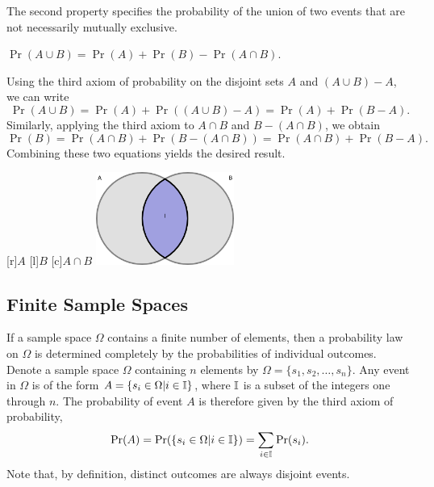 The second property specifies the probability of the union of two events that are not necessarily mutually exclusive.
\begin{proposition}
$\Pr (A \cup B) = \Pr (A) + \Pr (B) - \Pr (A \cap B)$.
\end{proposition}

Using the third axiom of probability on the disjoint sets $A$ and $(A \cup B) - A$, we can write
\begin{equation*}
\Pr (A \cup B)
= \Pr (A) + \Pr ((A \cup B) - A)
= \Pr (A) + \Pr (B - A) .
\end{equation*}
Similarly, applying the third axiom to $A \cap B$ and $B - (A \cap B)$, we obtain
\begin{equation*}
\Pr (B)
= \Pr (A \cap B) + \Pr (B - (A \cap B))
= \Pr (A \cap B) + \Pr (B - A) .
\end{equation*}
Combining these two equations yields the desired result.

\begin{center}
\begin{psfrags}
[r]{$A$}
[l]{$B$}
[c]{$A \cap B$}
\includegraphics[height=3.03cm]{Figures/2Chapter/intersection}
\end{psfrags}
\end{center}


\subsection{Finite Sample Spaces}
\label{section:FiniteSampleSpaces}

If a sample space $\Omega$ contains a finite number of elements, then a probability law on $\Omega$ is determined completely by the probabilities of individual outcomes.
Denote a sample space $\Omega$ containing $n$ elements by $\Omega = \{ s_1, s_2, \ldots, s_n \}$.
Any event in $\Omega$ is of the form $A = \{ s_i \in \Omega | i \in \mathbb{I} \}$, where $\mathbb{I}$ is a subset of the integers one through $n$.
The probability of event $A$ is therefore given by the third axiom of probability,
\begin{equation*}
\Pr (A)
= \Pr ( \{ s_i \in \Omega | i \in \mathbb{I} \} )
= \sum_{i \in \mathbb{I}} \Pr (s_i) .
\end{equation*}
Note that, by definition, distinct outcomes are always disjoint events.


